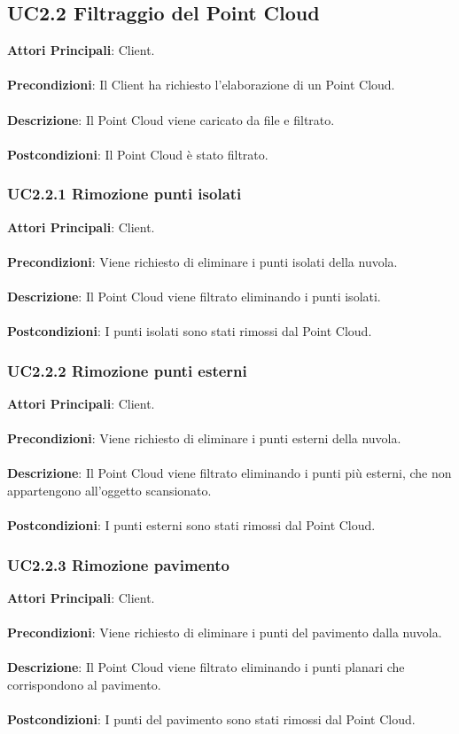\subsection{UC2.2 Filtraggio del Point Cloud}
\textbf{Attori Principali}: Client.
\\\\ \textbf{Precondizioni}: Il Client ha richiesto l'elaborazione di un Point Cloud.
\\\\ \textbf{Descrizione}: Il Point Cloud viene caricato da file e filtrato.
\\\\ \textbf{Postcondizioni}: Il Point Cloud è stato filtrato.

\subsubsection{UC2.2.1 Rimozione punti isolati}
\textbf{Attori Principali}: Client.
\\\\ \textbf{Precondizioni}: Viene richiesto di eliminare i punti isolati della nuvola.
\\\\ \textbf{Descrizione}: Il Point Cloud viene filtrato eliminando i punti isolati.
\\\\ \textbf{Postcondizioni}: I punti isolati sono stati rimossi dal Point Cloud.

\subsubsection{UC2.2.2 Rimozione punti esterni}
\textbf{Attori Principali}: Client.
\\\\ \textbf{Precondizioni}: Viene richiesto di eliminare i punti esterni della nuvola.
\\\\ \textbf{Descrizione}: Il Point Cloud viene filtrato eliminando i punti più esterni, che non appartengono all'oggetto scansionato.
\\\\ \textbf{Postcondizioni}: I punti esterni sono stati rimossi dal Point Cloud.

\subsubsection{UC2.2.3 Rimozione pavimento}
\textbf{Attori Principali}: Client.
\\\\ \textbf{Precondizioni}: Viene richiesto di eliminare i punti del pavimento dalla nuvola.
\\\\ \textbf{Descrizione}: Il Point Cloud viene filtrato eliminando i punti planari che corrispondono al pavimento.
\\\\ \textbf{Postcondizioni}: I punti del pavimento sono stati rimossi dal Point Cloud.

